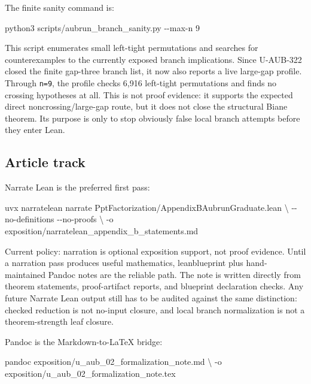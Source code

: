 \documentclass[
]{article}
\newenvironment{Shaded}{}{}
\newcommand{\NormalTok}[1]{#1}
\begin{document}
The finite sanity command is:

\begin{Shaded}
\begin{Highlighting}[]
\NormalTok{python3 scripts/aubrun\_branch\_sanity.py {-}{-}max{-}n 9}
\end{Highlighting}
\end{Shaded}

This script enumerates small left-tight permutations and searches for
counterexamples to the currently exposed branch implications. Since
U-AUB-322 closed the finite gap-three branch list, it now also reports a
live large-gap profile. Through \texttt{n=9}, the profile checks 6,916
left-tight permutations and finds no crossing hypotheses at all. This is
not proof evidence: it supports the expected direct
noncrossing/large-gap route, but it does not close the structural Biane
theorem. Its purpose is only to stop obviously false local branch
attempts before they enter Lean.

\subsection{Article track}\label{article-track}

Narrate Lean is the preferred first pass:

\begin{Shaded}
\begin{Highlighting}[]
\NormalTok{uvx narratelean narrate PptFactorization/AppendixBAubrunGraduate.lean \textbackslash{}}
\NormalTok{  {-}{-}no{-}definitions {-}{-}no{-}proofs \textbackslash{}}
\NormalTok{  {-}o exposition/narratelean\_appendix\_b\_statements.md}
\end{Highlighting}
\end{Shaded}

Current policy: narration is optional exposition support, not proof
evidence. Until a narration pass produces useful mathematics,
leanblueprint plus hand-maintained Pandoc notes are the reliable path.
The note is written directly from theorem statements, proof-artifact
reports, and blueprint declaration checks. Any future Narrate Lean
output still has to be audited against the same distinction: checked
reduction is not no-input closure, and local branch normalization is not
a theorem-strength leaf closure.

Pandoc is the Markdown-to-LaTeX bridge:

\begin{Shaded}
\begin{Highlighting}[]
\NormalTok{pandoc exposition/u\_aub\_02\_formalization\_note.md \textbackslash{}}
\NormalTok{  {-}o exposition/u\_aub\_02\_formalization\_note.tex}
\end{Highlighting}
\end{Shaded}
\end{document}
